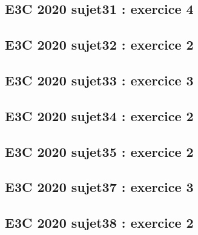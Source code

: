 \documentclass[lang=fr,edition=teacher,layout=sheet]{mxbook}
\begin{document}
\par\bigskip
{}\subsection*{E3C 2020 sujet31 : exercice 4}
\begingroup\endgroup
\par\bigskip
{}\subsection*{E3C 2020 sujet32 : exercice 2}
\begingroup\endgroup
\par\bigskip
{}\subsection*{E3C 2020 sujet33 : exercice 3}
\begingroup\endgroup
\par\bigskip
{}\subsection*{E3C 2020 sujet34 : exercice 2}
\begingroup\endgroup
\par\bigskip
{}\subsection*{E3C 2020 sujet35 : exercice 2}
\begingroup\endgroup
\par\bigskip
{}\subsection*{E3C 2020 sujet37 : exercice 3}
\begingroup\endgroup
\par\bigskip
{}\subsection*{E3C 2020 sujet38 : exercice 2}
\begingroup\endgroup
\par\bigskip
\end{document}
